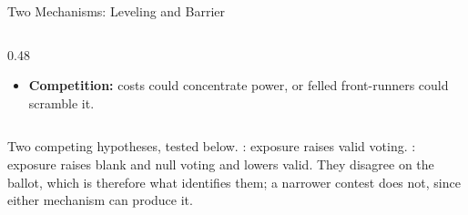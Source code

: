 \begin{frame}[t]{Two Mechanisms: Leveling and Barrier}
\begin{columns}[T]
\begin{column}{0.48\textwidth}
\begin{itemize}
  \item[\ns{?}] \textbf{Competition:} costs could concentrate power, or felled front-runners could scramble it. 
\end{itemize}
\end{column}
\end{columns}
\vfill
{\footnotesize Two competing hypotheses, tested below. : exposure raises valid voting. : exposure raises blank and null voting and lowers valid. They disagree on the ballot, which is therefore what identifies them; a narrower contest does not, since either mechanism can produce it.\hfill\hyperlink{src:signal}{}}
\end{frame}
